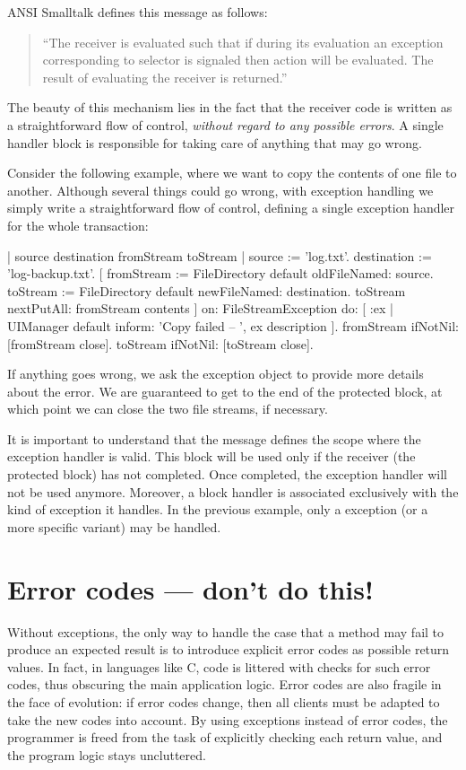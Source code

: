 \documentclass[a4paper,10pt,twoside]{book}
\begin{document}
ANSI Smalltalk defines this message as follows:
\begin{quote}
``The receiver is evaluated such that if during its evaluation an exception corresponding to selector is signaled then action will be evaluated. The result of evaluating the receiver is returned.''
\end{quote}

The beauty of this mechanism lies in the fact that the receiver code is written as a straightforward flow of control, \emph{without regard to any possible errors}. A single handler block is responsible for taking care of anything that may go wrong.

Consider the following example, where we want to copy the contents of one file to another.
Although several things could go wrong, with exception handling we simply write a straightforward flow of control, defining a single exception handler for the whole transaction:
\begin{code}{| source destination fromStream toStream |}
source := 'log.txt'.
destination := 'log-backup.txt'.
[	fromStream := FileDirectory default oldFileNamed: source.
	toStream := FileDirectory default newFileNamed: destination.
	toStream nextPutAll: fromStream contents
]
	on: FileStreamException
	do: [ :ex | UIManager default inform: 'Copy failed -- ', ex description ].
fromStream ifNotNil: [fromStream close].
toStream ifNotNil: [toStream close].
\end{code}
If anything goes wrong, we ask the exception object to provide more details about the error.
We are guaranteed to get to the end of the protected block, at which point we can close the two file streams, if necessary.

It is important to understand  that the message  defines the scope where the exception handler is valid. This block will be used only if the receiver (\ie the protected block) has not completed. Once completed, the exception handler will not be used anymore. Moreover, a block handler is associated exclusively with the kind of exception it handles. In the previous example, only a  exception (or a more specific variant) may be handled.

\section{Error codes --- don't  do this!}

Without exceptions, the only way to handle the case that a method may fail to produce an expected result is to introduce explicit error codes as possible return values. In fact, in languages like C, code is littered with checks for such error codes, thus obscuring the main application logic.
Error codes are also fragile in the face of evolution: if error codes change, then all clients must be adapted to take the new codes into account. By using exceptions instead of error codes, the programmer is freed from the task of explicitly checking each return value, and the program logic stays uncluttered.
\end{document}
